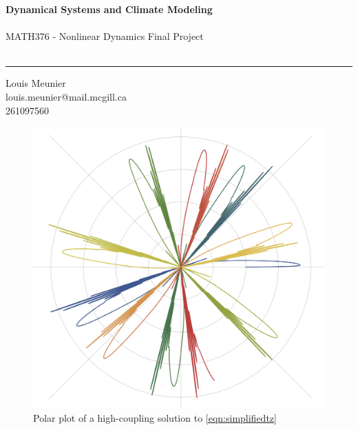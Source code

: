 \documentclass[12pt]{article}
\newcommand{\titlename}{Dynamical Systems and Climate Modeling}
\newcommand{\subtitlename}{MATH376 - Nonlinear Dynamics Final Project}
\begin{document}
\pagestyle{plain}
\thispagestyle{empty}

\noindent
{\huge\textbf{\titlename}}\\\\
{\large \subtitlename}\\\\
\rule[2ex]{\textwidth}{2.5pt}
\begin{center}
{\small Louis Meunier}\\
{\small louis.meunier@mail.mcgill.ca}\\
{\small 261097560}
\end{center}
\begin{figure}[!ht]
    \centering
    \includegraphics*[width=0.7\linewidth]{figures/title.png}
    \caption*{\scriptsize Polar plot of a high-coupling solution to \cref{eqn:simplifiedtz}}
\end{figure}
\begin{abstract}
    The atmosphere is a notoriously complicated system to effectively model. From a mathematical standpoint, there is a necessity for a particular amount of simplicity and physical assumptions in order for models to be reasonable to analyze. On the other hand, excessive simplifications lead to misrepresentative results which, while analytically convenient, are, from an application standpoint, functionally useless.

    In this article, we will give an overview of approaches that attempt to thread the line of these differing necessities, with a focus on Delay Differential Equations (DDEs), their effectiveness in modeling natural phenomena, and some methods used to analyze them. More specifically, we will be looking at various models used to describe the El Niño Southern Oscillation, an important, well-studied, yet generally poorly understand phenomena in climatology.
\end{abstract}
\newpage
{}
\small{\tableofcontents}
\end{document}
